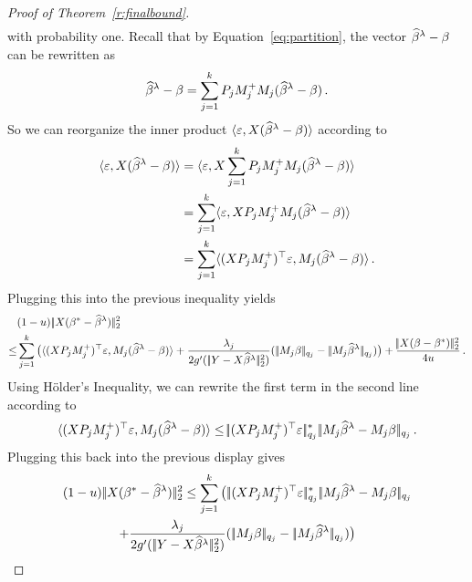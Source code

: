 \documentclass[bj]{imsart}
\newcommand{\normtwo}[1]{\ensuremath{\!|\!| #1 | \! |_{2}}}
\newcommand{\normqj}[1]{\ensuremath{\!|\!| #1 | \! |_{q_j}}}
\newcommand{\normqjd}[1]{\ensuremath{\!|\!| #1 | \! |_{q_j}^*}}
\newcommand{\1}{{\rm 1}\mskip -4,5mu{\rm l} }
\newcommand{\betatrue}{\beta^*}
\newcommand{\genbeta}{\textcolor{black}{\beta}}
\newcommand{\genconstant}{\textcolor{black}{\ensuremath{u}}}
\begin{document}
\begin{proof}[Proof of Theorem~\ref{r:finalbound}]
\begin{multline*}
\end{multline*}
with probability one.
Recall that by Equation~\eqref{eq:partition},  the vector $\estimatort-\genbeta$ can be rewritten as
\begin{align*}
\estimatort-\genbeta=\sum_{j=1}^\numbergroups \projectionmatrix_{j} \fusedmatrix_j^+\fusedmatrix_{j} (\estimatort-\genbeta)\,.
\end{align*}
So we can reorganize the inner product $\langle \noise, \design(\estimatort-\genbeta) \rangle$ according to
\begin{align*}
 \langle \noise, \design(\estimatort-\genbeta)\rangle
&= \langle \noise, \design \sum_{j=1}^\numbergroups \projectionmatrix_{j} \fusedmatrix_j^+\fusedmatrix_{j} (\estimatort-\genbeta) \rangle\\
&= \sum_{j=1}^\numbergroups \langle \noise, \design\projectionmatrix_{j} \fusedmatrix_j^+\fusedmatrix_{j} (\estimatort-\genbeta)\rangle\\
&=\sum_{j=1}^\numbergroups  \langle  (\design  \projectionmatrix_j\fusedmatrix_{j}^+)^\top\noise, \fusedmatrix_{j} (\estimatort-\genbeta)\rangle\,.
\end{align*}
Plugging this into the previous inequality yields
\begin{align*}
&(1-\genconstant)\,\normtwo{\design(\betatrue-\estimatort)}^2 \\      
\le & \sum_{j=1}^\numbergroups\big( \langle  (\design   \projectionmatrix_j \fusedmatrix_j^{+})^\top\noise, \fusedmatrix_j (\estimatort-\genbeta)\rangle+\frac{\lambda_j}{2g'(\,\normtwo{\outcome-\design\estimatort}^2)}(\,\normqj{\fusedmatrix_j \genbeta}-\,\normqj{\fusedmatrix_j\estimatort})\big)+\frac{\normtwo{\design(\genbeta-\betatrue)}^2}{4\genconstant}\,.
\end{align*}
Using H\"older's Inequality, we can rewrite the first term in the second line according to
\begin{align*}
 \langle  (\design  \projectionmatrix_j \fusedmatrix_j^{+})^\top\noise, \fusedmatrix_j (\estimatort-\genbeta)\rangle \le \normqjd{(\design   \projectionmatrix_j \fusedmatrix_j^{+})^\top\noise}\,\normqj{\fusedmatrix_j\estimatort-\fusedmatrix_j \genbeta}\,.
\end{align*}
Plugging this back into the previous display gives
\begin{multline*}
(1-\genconstant)\,\normtwo{\design(\betatrue-\estimatort)}^2 
\leq  \sum_{j=1}^\numbergroups\big(\,\normqjd{(\design  \projectionmatrix_j \fusedmatrix_j^{+})^\top\noise}\,\normqj{\fusedmatrix_j\estimatort-\fusedmatrix_j \genbeta}\\+\frac{\lambda_j}{2g'(\,\normtwo{\outcome-\design\estimatort}^2)}(\,\normqj{\fusedmatrix_j \genbeta}-\,\normqj{\fusedmatrix_j\estimatort})\big)

\end{multline*}
\end{proof}
\end{document}
